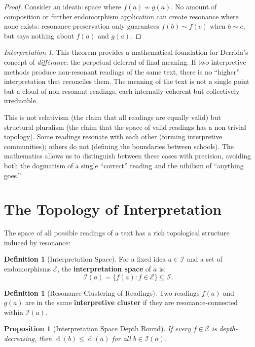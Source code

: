 \documentclass[11pt,openany]{book}
\theoremstyle{definition}
\newtheorem{definition}[axiom]{Definition}
\theoremstyle{plain}
\newtheorem{proposition}[axiom]{Proposition}
\theoremstyle{remark}
\newtheorem{interpretation}[axiom]{Interpretation}
\newcommand{\IS}{\mathcal{I}}               %
\newcommand{\res}{\sim}                      %
\newcommand{\depth}{\operatorname{d}}       %
\begin{document}
\begin{proof}
Consider an ideatic space where $f(a) \not\res g(a)$. No amount of composition or further endomorphism application can create resonance where none exists: resonance preservation only guarantees $f(b) \res f(c)$ when $b \res c$, but says nothing about $f(a)$ and $g(a)$.
\end{proof}

\begin{interpretation}
This theorem provides a mathematical foundation for Derrida's concept of \emph{différance}: the perpetual deferral of final meaning. If two interpretive methods produce non-resonant readings of the same text, there is no ``higher'' interpretation that reconciles them. The meaning of the text is not a single point but a cloud of non-resonant readings, each internally coherent but collectively irreducible.

This is not relativism (the claim that all readings are equally valid) but structural pluralism (the claim that the space of valid readings has a non-trivial topology). Some readings resonate with each other (forming interpretive communities); others do not (defining the boundaries between schools). The mathematics allows us to distinguish between these cases with precision, avoiding both the dogmatism of a single ``correct'' reading and the nihilism of ``anything goes.''
\end{interpretation}

\section{The Topology of Interpretation}

The space of all possible readings of a text has a rich topological structure induced by resonance:

\begin{definition}[Interpretation Space]
For a fixed idea $a \in \IS$ and a set of endomorphisms $\mathcal{E}$, the \textbf{interpretation space} of $a$ is:
\[
\mathcal{I}(a) = \{f(a) : f \in \mathcal{E}\} \subseteq \IS.
\]
\end{definition}

\begin{definition}[Resonance Clustering of Readings]
Two readings $f(a)$ and $g(a)$ are in the same \textbf{interpretive cluster} if they are resonance-connected within $\mathcal{I}(a)$.
\end{definition}

\begin{proposition}[Interpretation Space Depth Bound]
If every $f \in \mathcal{E}$ is depth-decreasing, then $\depth(b) \leq \depth(a)$ for all $b \in \mathcal{I}(a)$.
\end{proposition}
\end{document}
